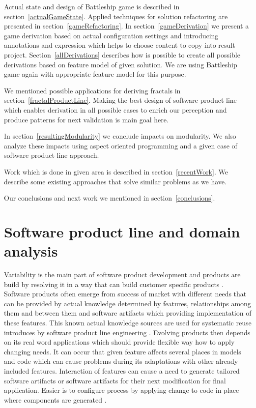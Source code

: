 \documentclass[11pt,english,a4paper,twoside]{article}
\begin{document}
Actual state and design of Battleship game is described in section~\ref{actualGameState}. Applied techniques for solution refactoring are presented in section~\ref{gameRefactoring}. In section~\ref{gameDerivation} we present a game derivation based on actual configuration settings and introducing annotations and expression which helps to choose content to copy into result project. 
Section~\ref{allDerivations} describes how is possible to create all possible derivations based on feature model of given solution. We are using Battleship game again with appropriate feature model for this purpose. 

We mentioned possible applications for deriving fractals in section~\ref{fractalProductLine}. Making the best design of software product line which enables derivation in all possible cases to enrich our perception and produce patterns for next validation is main goal here.  

In section~\ref{resultingModularity} we conclude impacts on modularity. We also analyze these impacts using aspect oriented programming and a given case of software product line approach.

Work which is done in given area is described in section~\ref{recentWork}. We describe some existing approaches that solve similar problems as we have.

Our conclusions and next work we mentioned in section~\ref{conclusions}.


\section{Software product line and domain analysis} \label{domainAnalysis}

Variability is the main part of software product development and products are build by resolving it in a way that can build customer specific products \cite{botterweck_automating_2009}. Software products often emerge from success of market with different needs that can be provided by actual knowledge determined by features, relationships among them and between them and software artifacts which providing implementation of these features. This known actual knowledge sources are used for systematic reuse introduces by software product line engineering \cite{reinhartz-berger_domain_2013}. Evolving products then depends on its real word applications which should provide flexible way how to apply changing needs. It can occur that given feature affects several places in models and code which can cause problems during its adaptations with other already included features. Interaction of features can cause a need to generate tailored software artifacts or software artifacts for their next modification for final application. Easier is to configure process by applying change to code in place where components are generated \cite{vranic_features_2016}. 
\end{document}
